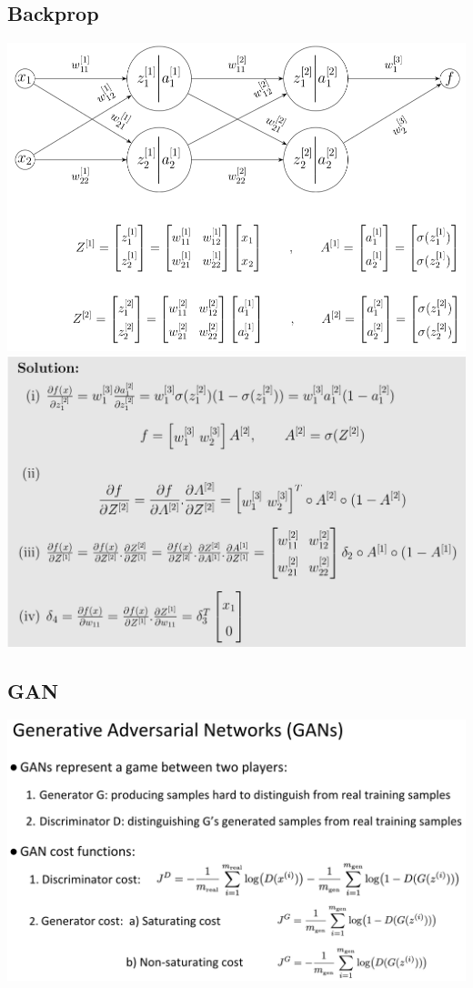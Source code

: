 \subsection*{Backprop}
\includegraphics[width=\linewidth]{network.png}
\includegraphics[width=\linewidth]{network_sol.png}

\subsection*{GAN}
\includegraphics[width=\linewidth]{gan.png}

